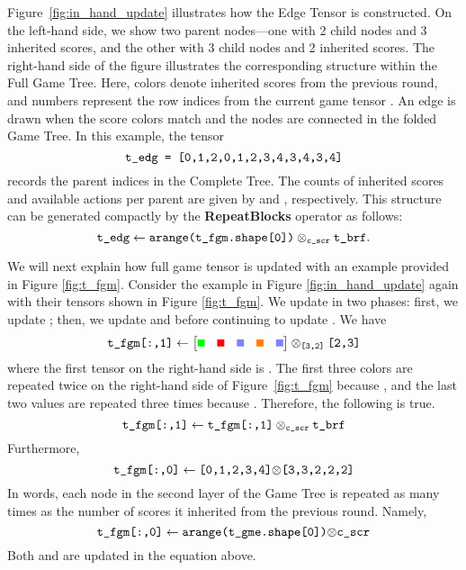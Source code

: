 Figure~\ref{fig:in_hand_update} illustrates how the Edge Tensor  is constructed. On the left-hand side, we show two parent nodes—one with 2 child nodes and 3 inherited scores, and the other with 3 child nodes and 2 inherited scores. The right-hand side of the figure illustrates the corresponding structure within the Full Game Tree. Here, colors denote inherited scores from the previous round, and numbers represent the row indices from the current game tensor . An edge is drawn when the score colors match and the nodes are connected in the folded Game Tree. In this example, the tensor
\[
\texttt{t\_edg = [0,1,2,0,1,2,3,4,3,4,3,4]}
\]
records the parent indices in the Complete Tree. The counts of inherited scores and available actions per parent are given by  and , respectively. This structure can be generated compactly by the \textbf{RepeatBlocks} operator as follows:
\[
\texttt{t\_edg} \leftarrow \texttt{arange(t\_fgm.shape[0])} \otimes_{\texttt{c\_scr}} \texttt{t\_brf}.
\]

We will next explain how full game tensor  is updated with an example provided in Figure \ref{fig:t_fgm}. Consider the example in Figure \ref{fig:in_hand_update} again with their  tensors shown in Figure \ref{fig:t_fgm}. We update  in two phases: first, we update ; then, we update  and  before continuing to update . We have 
\[
    \py{t\_fgm[:,1]} \leftarrow 
    \begin{bmatrix}
        \tikz[baseline] \fill[green] (0,0) rectangle (0.2,0.2); &
        \tikz[baseline] \fill[red] (0,0) rectangle (0.2,0.2); &
        \tikz[baseline] \fill[fill=blue!50] (0,0) rectangle (0.2,0.2); &
        \tikz[baseline] \fill[orange] (0,0) rectangle (0.2,0.2); &
        \tikz[baseline] \fill[fill=blue!50] (0,0) rectangle (0.2,0.2); 
    \end{bmatrix}
    \otimes_{\py{[3,2]}}\py{[2,3]}
    \]
    where the first tensor on the right-hand side is . The first three colors are repeated twice on the right-hand side of Figure~\ref{fig:t_fgm} because , and the last two values are repeated three times because . Therefore, the following is true.
    \[
        \texttt{t\_fgm[:,1]} \leftarrow \texttt{t\_fgm[:,1]}\otimes_{\texttt{c\_scr}} \texttt{t\_brf}
        \]
        Furthermore, 
        \[
            \texttt{t\_fgm[:,0]} \leftarrow \texttt{[0,1,2,3,4]$\otimes$[3,3,2,2,2]} 
            \]
            In words, each node in the second layer of the Game Tree is repeated as many times as the number of scores it inherited from the previous round. Namely, 
            \[
                \texttt{t\_fgm[:,0]}\leftarrow \texttt{arange(t\_gme.shape[0])$\otimes$c\_scr}
                \]
                Both  and  are updated in the equation above. 
                
